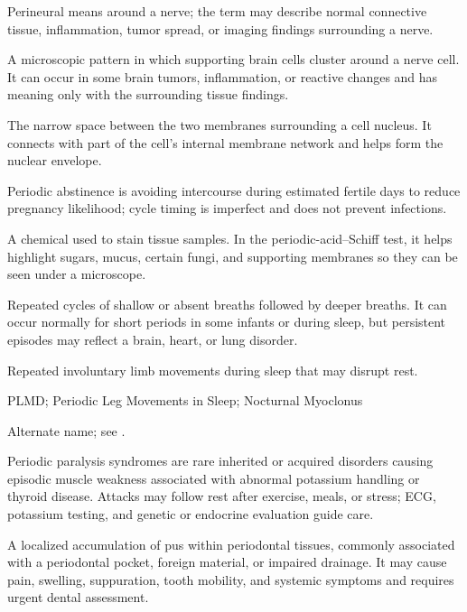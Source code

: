 Perineural means around a nerve; the term may describe normal connective tissue, inflammation, tumor spread, or imaging findings surrounding a nerve.

 A microscopic pattern in which supporting brain cells cluster around a nerve cell. It can occur in some brain tumors, inflammation, or reactive changes and has meaning only with the surrounding tissue findings.

 The narrow space between the two membranes surrounding a cell nucleus. It connects with part of the cell’s internal membrane network and helps form the nuclear envelope.

 Periodic abstinence is avoiding intercourse during estimated fertile days to reduce pregnancy likelihood; cycle timing is imperfect and does not prevent infections.

 A chemical used to stain tissue samples. In the periodic-acid–Schiff test, it helps highlight sugars, mucus, certain fungi, and supporting membranes so they can be seen under a microscope.

 Repeated cycles of shallow or absent breaths followed by deeper breaths. It can occur normally for short periods in some infants or during sleep, but persistent episodes may reflect a brain, heart, or lung disorder.

 Repeated involuntary limb movements during sleep that may disrupt rest.

\synonyms
PLMD; Periodic Leg Movements in Sleep; Nocturnal Myoclonus

 Alternate name; see .

 Periodic paralysis syndromes are rare inherited or acquired disorders causing episodic muscle weakness associated with abnormal potassium handling or thyroid disease. Attacks may follow rest after exercise, meals, or stress; ECG, potassium testing, and genetic or endocrine evaluation guide care.

 A localized accumulation of pus within periodontal tissues, commonly associated with a
periodontal pocket, foreign material, or impaired drainage. It may cause pain, swelling,
suppuration, tooth mobility, and systemic symptoms and requires urgent dental
assessment.

